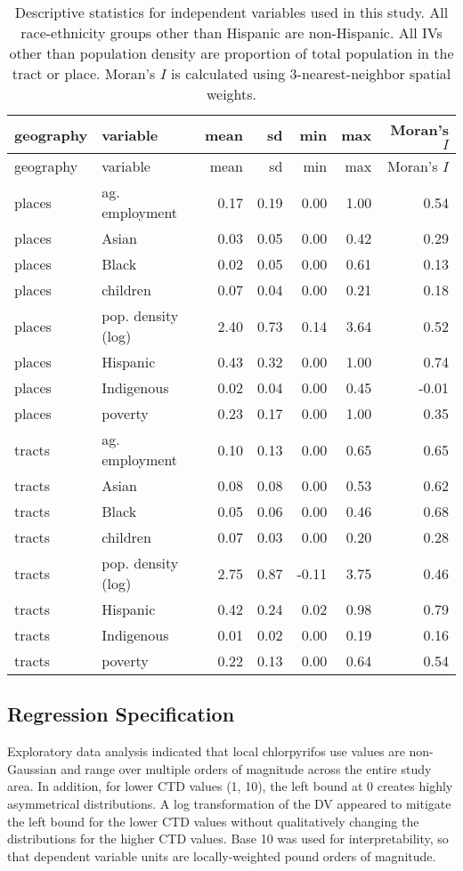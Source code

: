 \documentclass[ijerph,article,submit,oneauthor,pdftex]{Definitions/mdpi}
\begin{document}
\begin{longtable}[]{@{}llrrrrr@{}}
\caption{Descriptive statistics for independent variables used in this study. All race-ethnicity groups other than Hispanic are non-Hispanic. All IVs other than population density are proportion of total population in the tract or place. Moran's \(I\) is calculated using 3-nearest-neighbor spatial weights. \label{tab.desc_stats}}\tabularnewline
\toprule
geography & variable & mean & sd & min & max & Moran's \(I\)\tabularnewline
\midrule
\endfirsthead
\toprule
geography & variable & mean & sd & min & max & Moran's \(I\)\tabularnewline
\midrule
\endhead
places & ag. employment & 0.17 & 0.19 & 0.00 & 1.00 & 0.54\tabularnewline
places & Asian & 0.03 & 0.05 & 0.00 & 0.42 & 0.29\tabularnewline
places & Black & 0.02 & 0.05 & 0.00 & 0.61 & 0.13\tabularnewline
places & children & 0.07 & 0.04 & 0.00 & 0.21 & 0.18\tabularnewline
places & pop. density (log) & 2.40 & 0.73 & 0.14 & 3.64 & 0.52\tabularnewline
places & Hispanic & 0.43 & 0.32 & 0.00 & 1.00 & 0.74\tabularnewline
places & Indigenous & 0.02 & 0.04 & 0.00 & 0.45 & -0.01\tabularnewline
places & poverty & 0.23 & 0.17 & 0.00 & 1.00 & 0.35\tabularnewline
tracts & ag. employment & 0.10 & 0.13 & 0.00 & 0.65 & 0.65\tabularnewline
tracts & Asian & 0.08 & 0.08 & 0.00 & 0.53 & 0.62\tabularnewline
tracts & Black & 0.05 & 0.06 & 0.00 & 0.46 & 0.68\tabularnewline
tracts & children & 0.07 & 0.03 & 0.00 & 0.20 & 0.28\tabularnewline
tracts & pop. density (log) & 2.75 & 0.87 & -0.11 & 3.75 & 0.46\tabularnewline
tracts & Hispanic & 0.42 & 0.24 & 0.02 & 0.98 & 0.79\tabularnewline
tracts & Indigenous & 0.01 & 0.02 & 0.00 & 0.19 & 0.16\tabularnewline
tracts & poverty & 0.22 & 0.13 & 0.00 & 0.64 & 0.54\tabularnewline
\bottomrule
\end{longtable}

\hypertarget{regression-specification}{%
\subsection{Regression Specification}\label{regression-specification}}

Exploratory data analysis indicated that local chlorpyrifos use values are non-Gaussian and range over multiple orders of magnitude across the entire study area. In addition, for lower CTD values (1, 10), the left bound at 0 creates highly asymmetrical distributions. A log transformation of the DV appeared to mitigate the left bound for the lower CTD values without qualitatively changing the distributions for the higher CTD values. Base 10 was used for interpretability, so that dependent variable units are locally-weighted pound orders of magnitude.
\end{document}
